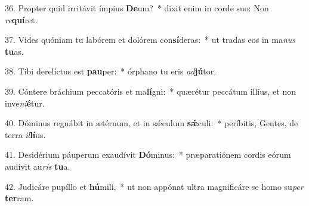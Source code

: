 36. Propter quid irritávit ímpius \textbf{De}um?~*  dixit enim in corde suo: Non \textit{re}\textbf{quí}ret.\

37. Vides quóniam tu labórem et dolórem con\textbf{sí}deras:~*  ut tradas eos in ma\textit{nus} \textbf{tu}as.\

38. Tibi derelíctus est \textbf{pau}per:~*  órphano tu eris \textit{ad}\textbf{jú}tor.\

39. Cóntere bráchium peccatóris et ma\textbf{lí}gni:~*  quærétur peccátum illíus, et non inve\textit{ni}\textbf{é}tur.\

40. Dóminus regnábit in ætérnum, et in sǽculum \textbf{sǽ}culi:~*  períbitis, Gentes, de terra \textit{il}\textbf{lí}us.\

41. Desidérium páuperum exaudívit \textbf{Dó}minus:~*  præparatiónem cordis eórum audívit au\textit{ris} \textbf{tu}a.\

42. Judicáre pupíllo et \textbf{hú}mili,~*  ut non appónat ultra magnificáre se homo su\textit{per} \textbf{ter}ram.\

